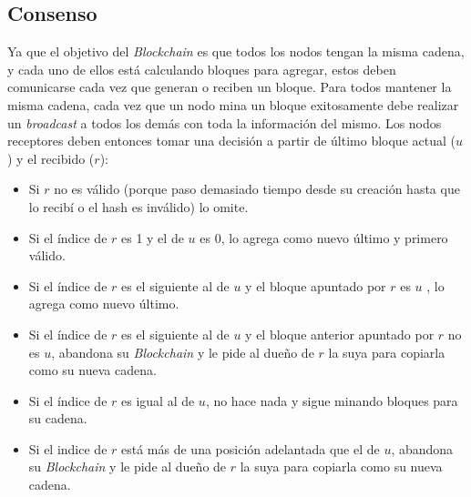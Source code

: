 \subsection{Consenso}
Ya que el objetivo del \textit{Blockchain} es que todos los nodos tengan la misma cadena, y cada uno de ellos est\'a calculando bloques para agregar, estos deben comunicarse cada vez que generan o reciben un bloque. Para todos mantener la misma cadena, cada vez que un nodo mina un bloque exitosamente debe realizar un \textit{broadcast} a todos los dem\'as con toda la informaci\'on del mismo. Los nodos receptores deben entonces tomar una decisión a partir de \'ultimo bloque actual ($u$) y el recibido ($r$):
\begin{itemize}
	\item Si $r$ no es v\'alido (porque paso demasiado tiempo desde su creaci\'on hasta que lo recib\'i o el hash es inv\'alido) lo omite.
	\item Si el \'indice de $r$ es 1 y el de $u$ es 0, lo agrega como nuevo \'ultimo y primero v\'alido.
	\item Si el \'indice de $r$ es el siguiente al de $u$ y el bloque apuntado por $r$ es $u$ , lo agrega como nuevo \'ultimo.
	\item Si el \'indice de $r$ es el siguiente al de $u$ y el bloque anterior apuntado por $r$ no es $u$, abandona su \textit{Blockchain} y le pide al due\~no de $r$ la suya para copiarla como su nueva cadena.
	\item Si el \'indice de $r$ es igual al de $u$, no hace nada y sigue minando bloques para su cadena.
	\item Si el indice de $r$ est\'a m\'as de una posici\'on adelantada que el de $u$, abandona su \textit{Blockchain} y le pide al due\~no de $r$ la suya para copiarla como su nueva cadena.
\end{itemize}
















